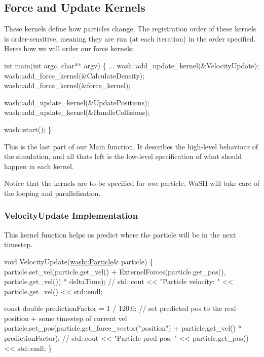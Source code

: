 \subsection*{Force and Update Kernels}

These kernels define how particles change. The registration order of these kernels is order-\/sensitive, meaning they are run (at each iteration) in the order specified. Here\textquotesingle{}s how we will order our force kernels\+: 
\begin{DoxyCode}
\textcolor{keywordtype}{int} main(\textcolor{keywordtype}{int} argc, \textcolor{keywordtype}{char}** argv) \{
    ...
    wash::add\_update\_kernel(&VelocityUpdate);
    wash::add\_force\_kernel(&CalculateDensity);
    wash::add\_force\_kernel(&force\_kernel);

    wash::add\_update\_kernel(&UpdatePositions);
    wash::add\_update\_kernel(&HandleCollisions);

    wash::start();
\}
\end{DoxyCode}
 This is the last part of our Main function. It describes the high-\/level behaviour of the simulation, and all that\textquotesingle{}s left is the low-\/level specification of what should happen in each kernel.

Notice that the kernels are to be specified for {\itshape one} particle. Wa\+SH will take care of the looping and parallelisation.

\subsubsection*{Velocity\+Update Implementation}

This kernel function helps us predict where the particle will be in the next timestep. 
\begin{DoxyCode}
\textcolor{keywordtype}{void} VelocityUpdate(\mbox{\hyperlink{classwash_1_1Particle}{wash::Particle}}& particle) \{
    particle.set\_vel(particle.get\_vel() + ExternelForces(particle.get\_pos(), particle.get\_vel()) * 
      deltaTime);
    \textcolor{comment}{// std::cout << "Particle velocity: " << particle.get\_vel() << std::endl;}

    \textcolor{keyword}{const} \textcolor{keywordtype}{double} predictionFactor = 1 / 120.0;
    \textcolor{comment}{// set predicted pos to the real position + some timestep of current vel}
    particle.set\_pos(particle.get\_force\_vector(\textcolor{stringliteral}{"position"}) + particle.get\_vel() * predictionFactor);
    \textcolor{comment}{// std::cout << "Particle pred pos: " << particle.get\_pos() << std::endl;}
\}
\end{DoxyCode}


